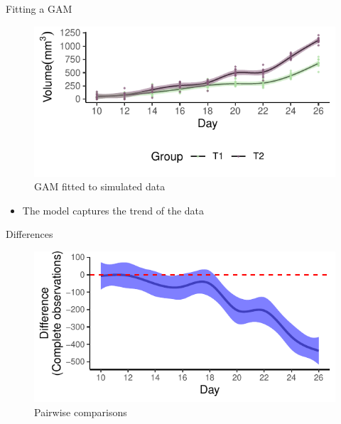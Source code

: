 \documentclass[
  ignorenonframetext,
]{beamer}
\newif\ifbibliography
\providecommand{\tightlist}{%
  \setlength{\itemsep}{0pt}\setlength{\parskip}{0pt}}\usepackage{longtable,booktabs,array}
\begin{document}
\begin{frame}{Fitting a GAM}
\protect\hypertarget{fitting-a-gam}{}
\begin{figure}

{\centering \includegraphics{MfPH_Next_Generation_AM_March_2023_files/figure-beamer/model-1.pdf}

}

\caption{GAM fitted to simulated data}

\end{figure}

\begin{itemize}[<+->]
\tightlist
\item
  The model captures the trend of the data
\end{itemize}
\end{frame}

\begin{frame}{Differences}
\protect\hypertarget{differences}{}
\begin{figure}

{\centering \includegraphics{MfPH_Next_Generation_AM_March_2023_files/figure-beamer/differences-1.pdf}

}

\caption{Pairwise comparisons}

\end{figure}
\end{frame}


\begin{frame}[allowframebreaks]{}
  \bibliographytrue
  \printbibliography[heading=none]
\end{frame}
\end{document}
